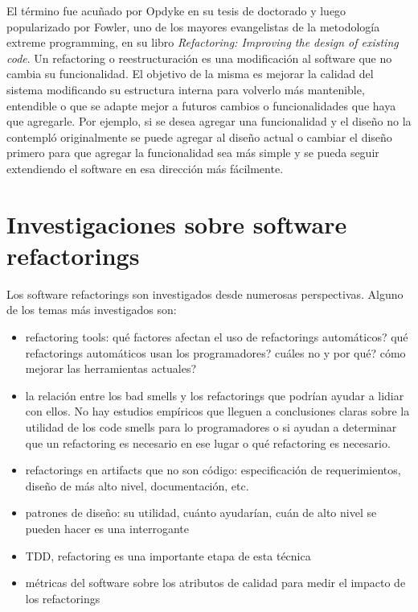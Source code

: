 El término fue acuñado por Opdyke en su tesis de doctorado y luego popularizado por Fowler, uno de
los mayores evangelistas de la metodología extreme programming, en su libro \textit{Refactoring:
Improving the design of existing code}. Un refactoring o reestructuración es una modificación al
software que no cambia su funcionalidad. El objetivo de la misma es mejorar la calidad del sistema
modificando su estructura interna para volverlo más mantenible, entendible o que se adapte mejor a
futuros cambios o funcionalidades que haya que agregarle. Por ejemplo, si se desea agregar una
funcionalidad y el diseño no la contempló originalmente se puede agregar al diseño actual o cambiar
el diseño primero para que agregar la funcionalidad sea más simple y se pueda seguir extendiendo el
software en esa dirección más fácilmente.


\section{Investigaciones sobre software refactorings}
Los software refactorings son investigados desde numerosas perspectivas. Alguno de los temas más
investigados son:
\begin{itemize}
    \item refactoring tools: qué factores afectan el uso de refactorings automáticos? qué
refactorings automáticos usan los programadores? cuáles no y por qué? cómo mejorar las herramientas actuales?
    \item la relación entre los bad smells y los refactorings que podrían ayudar a lidiar con ellos. No hay estudios
empíricos que lleguen a conclusiones claras sobre la utilidad de los code smells para lo
programadores o si ayudan a determinar que un refactoring es necesario en ese lugar o qué
refactoring es necesario.
    \item refactorings en artifacts que no son código: especificación de requerimientos, diseño de más alto nivel, documentación, etc.
    \item patrones de diseño: su utilidad, cuánto ayudarían, cuán de alto nivel se pueden hacer es una interrogante
    \item TDD, refactoring es una importante etapa de esta técnica 
    \item métricas del software sobre los atributos de calidad para medir el impacto de los
refactorings  
\end{itemize}


